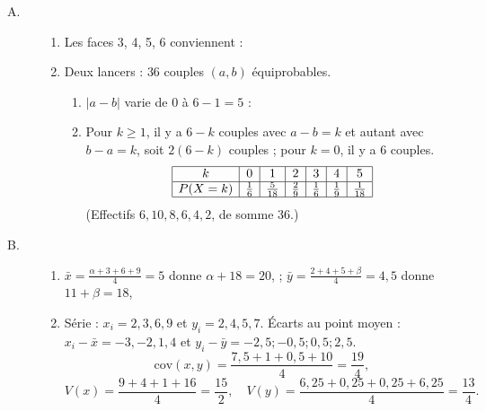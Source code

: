 \begin{description}
   \item[A.]
      \begin{enumerate}
         \item {}
            Les faces 3, 4, 5, 6 conviennent : 
         \item Deux lancers : $36$ couples $(a, b)$ \'equiprobables.
            \begin{enumerate}
               \item {} $|a - b|$ varie de $0$ \`a $6 - 1 = 5$ : 
               \item {}
                  Pour $k \geq 1$, il y a $6 - k$ couples avec $a - b = k$ et autant avec $b - a = k$, soit $2(6 - k)$ couples ;
                  pour $k = 0$, il y a $6$ couples.
                  \[
                     \begin{array}{|c|c|c|c|c|c|c|}
                        \hline
                        k & 0 & 1 & 2 & 3 & 4 & 5 \\ \hline
                        P(X = k) & \frac{1}{6} & \frac{5}{18} & \frac{2}{9} & \frac{1}{6} & \frac{1}{9} & \frac{1}{18} \\ \hline
                     \end{array}
                  \]
                  (Effectifs $6, 10, 8, 6, 4, 2$, de somme $36$.)
            \end{enumerate}
      \end{enumerate}
   \item[B.]
      \begin{enumerate}
         \item {}
            $\bar{x} = \frac{\alpha + 3 + 6 + 9}{4} = 5$ donne $\alpha + 18 = 20$,  ;
            $\bar{y} = \frac{2 + 4 + 5 + \beta}{4} = 4{,}5$ donne $11 + \beta = 18$, 
         \item {}
            S\'erie : $x_i = 2, 3, 6, 9$ et $y_i = 2, 4, 5, 7$. \'Ecarts au point moyen :
            $x_i - \bar{x} = -3, -2, 1, 4$ et $y_i - \bar{y} = -2{,}5 ; -0{,}5 ; 0{,}5 ; 2{,}5$.
            \[
               \mathrm{cov}(x, y) = \frac{7{,}5 + 1 + 0{,}5 + 10}{4} = \frac{19}{4}, \]\[
               V(x) = \frac{9 + 4 + 1 + 16}{4} = \frac{15}{2}, \quad
               V(y) = \frac{6{,}25 + 0{,}25 + 0{,}25 + 6{,}25}{4} = \frac{13}{4}.
\]
\end{enumerate}
\end{description}
